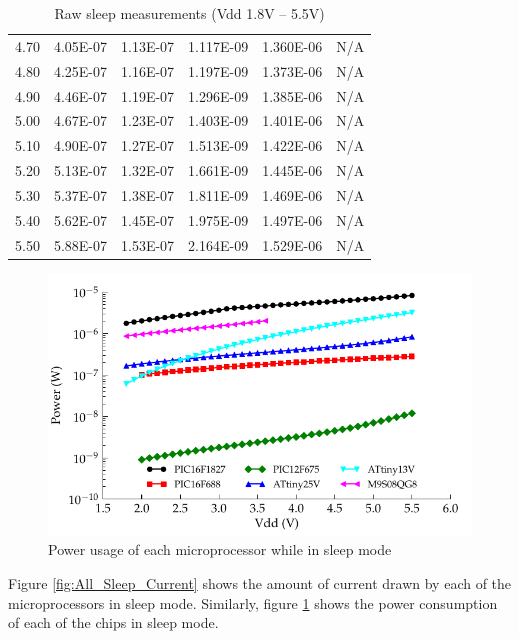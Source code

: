 \begin{table}[htp]
\begin{centering}
\begin{tabular}{|r|r|r|r|r|r|}
4.70  & 4.05E-07  & 1.13E-07  & 1.117E-09  & 1.360E-06  & N/A \tabularnewline
4.80  & 4.25E-07  & 1.16E-07  & 1.197E-09  & 1.373E-06  & N/A \tabularnewline
4.90  & 4.46E-07  & 1.19E-07  & 1.296E-09  & 1.385E-06  & N/A \tabularnewline
5.00  & 4.67E-07  & 1.23E-07  & 1.403E-09  & 1.401E-06  & N/A \tabularnewline
5.10  & 4.90E-07  & 1.27E-07  & 1.513E-09  & 1.422E-06  & N/A \tabularnewline
5.20  & 5.13E-07  & 1.32E-07  & 1.661E-09  & 1.445E-06  & N/A \tabularnewline
5.30  & 5.37E-07  & 1.38E-07  & 1.811E-09  & 1.469E-06  & N/A \tabularnewline
5.40  & 5.62E-07  & 1.45E-07  & 1.975E-09  & 1.497E-06  & N/A \tabularnewline
5.50  & 5.88E-07  & 1.53E-07  & 2.164E-09  & 1.529E-06  & N/A \tabularnewline
\hline
\end{tabular}
\par\end{centering}

\protect\caption{Raw sleep measurements (Vdd 1.8V -- 5.5V)}
\end{table}
\begin{figure}
\begin{centering}
\includegraphics{content/appendices/microprocessorPowerMeasurements/graphics/Graph_All_Sleeping_Power}
\par\end{centering}

\protect\caption{\label{fig:All_SleepPower}Power usage of each microprocessor while
in sleep mode}


\end{figure}


Figure \ref{fig:All_Sleep_Current} shows the amount of current drawn
by each of the microprocessors in sleep mode. Similarly, figure \ref{fig:All_SleepPower}
shows the power consumption of each of the chips in sleep mode.


